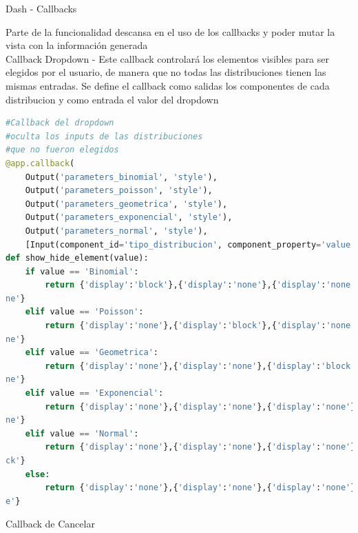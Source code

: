 \documentclass[
	12pt, %
]{fphw}
\begin{document}
\newpage

{\color{teal}
  \dotfill
  Dash - Callbacks
\dotfill}

Parte de la funcionalidad descansa en el uso de los callbacks y poder mutar la vista con la información generada \\

Callback Dropdown - Este callback controlará los elementos visibles para ser elegidos por el usuario, de manera que no todas las distribuciones tienen las mismas entradas. Se define el callback como salidas los componentes de cada distribucion y como entrada el valor del dropdown
\begin{lstlisting}[language=Python,caption=Callback dropdown]
#Callback del dropdown                                                                                     
#oculta los inputs de las distribuciones                                                                   
#que no fueron elegidos                                                                                    
@app.callback(
    Output('parameters_binomial', 'style'),
    Output('parameters_poisson', 'style'),
    Output('parameters_geometrica', 'style'),
    Output('parameters_exponencial', 'style'),
    Output('parameters_normal', 'style'),
    [Input(component_id='tipo_distribucion', component_property='value')])
def show_hide_element(value):
    if value == 'Binomial':
        return {'display':'block'},{'display':'none'},{'display':'none'},{'display':'none'},{'display':'no\
ne'}
    elif value == 'Poisson':
        return {'display':'none'},{'display':'block'},{'display':'none'},{'display':'none'},{'display':'no\
ne'}
    elif value == 'Geometrica':
        return {'display':'none'},{'display':'none'},{'display':'block'},{'display':'none'},{'display':'no\
ne'}
    elif value == 'Exponencial':
        return {'display':'none'},{'display':'none'},{'display':'none'},{'display':'block'},{'display':'no\
ne'}
    elif value == 'Normal':
        return {'display':'none'},{'display':'none'},{'display':'none'},{'display':'none'},{'display':'blo\
ck'}
    else:
        return {'display':'none'},{'display':'none'},{'display':'none'},{'display':'none'},{'display':'non\
e'}

\end{lstlisting}

\newpage
Callback de Cancelar\\
\end{document}
